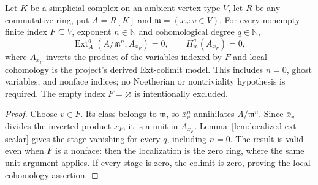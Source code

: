 \begin{theorem}\label{thm:localized-ext-rows}
Let $K$ be a simplicial complex on an ambient vertex type $V$, let $R$ be
any commutative ring, put $A=R[K]$ and $\mathfrak m=(\bar x_v:v\in V)$.
For every nonempty finite index $F\subseteq V$, exponent $n\in\mathbb N$
and cohomological degree $q\in\mathbb N$,
\[
  \operatorname{Ext}^q_A(A/\mathfrak m^n,A_{x_F})=0,
  \qquad H^q_{\mathfrak m}(A_{x_F})=0,
\]
where $A_{x_F}$ inverts the product of the variables indexed by $F$ and
local cohomology is the project's derived Ext-colimit model. This includes
$n=0$, ghost variables, and nonface indices; no Noetherian or nontriviality
hypothesis is required. The empty index $F=\varnothing$ is intentionally
excluded.
\leanok
\end{theorem}
\begin{proof}
Choose $v\in F$. Its class belongs to $\mathfrak m$, so $\bar x_v^n$
annihilates $A/\mathfrak m^n$. Since $\bar x_v$ divides the inverted
product $x_F$, it is a unit in $A_{x_F}$. Lemma~\ref{lem:localized-ext-scalar}
gives the stage vanishing for every $q$, including $n=0$. The result is
valid even when $F$ is a nonface: then the localization is the zero ring,
where the same unit argument applies. If every stage is zero, the colimit
is zero, proving the local-cohomology assertion.
\end{proof}

